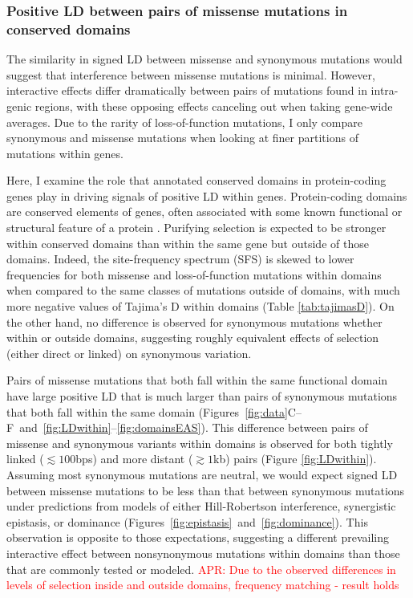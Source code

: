 \documentclass[]{article}
\newcommand{\comment}[1]{{\textcolor{red}{APR: #1}}}
\begin{document}
\subsubsection{Positive LD between pairs of missense mutations in conserved domains}

The similarity in signed LD between missense and synonymous mutations would
suggest that interference between missense mutations is minimal. However,
interactive effects differ dramatically between pairs of mutations found in
intra-genic regions, with these opposing effects canceling out when taking
gene-wide averages. Due to the rarity of loss-of-function mutations, I only
compare synonymous and missense mutations when looking at finer partitions of
mutations within genes.

Here, I examine the role that annotated conserved domains in protein-coding
genes play in driving signals of positive LD within genes. Protein-coding
domains are conserved elements of genes, often associated with some known
functional or structural feature of a protein \citep{Stanek2020-pa}. Purifying
selection is expected to be stronger within conserved domains than within the
same gene but outside of those domains. Indeed, the site-frequency spectrum
(SFS) is skewed to lower frequencies for both missense and loss-of-function
mutations within domains when compared to the same classes of mutations outside
of domains, with much more negative values of Tajima's D within domains (Table
\ref{tab:tajimasD}). On the other hand, no difference is observed for
synonymous mutations whether within or outside domains, suggesting roughly
equivalent effects of selection (either direct or linked) on synonymous
variation.

Pairs of missense mutations that both fall within the same functional domain
have large positive LD that is much larger than pairs of synonymous mutations
that both fall within the same domain
(Figures~\ref{fig:data}C--F~and~\ref{fig:LDwithin}--\ref{fig:domainsEAS}). This
difference between pairs of missense and synonymous variants within domains is
observed for both tightly linked (\(\lesssim 100\)bps) and more distant
(\(\gtrsim 1\)kb) pairs (Figure \ref{fig:LDwithin}). Assuming most
synonymous mutations are neutral, we would expect signed LD between missense
mutations to be less than that between synonymous mutations under predictions
from models of either Hill-Robertson interference, synergistic epistasis, or
dominance (Figures~\ref{fig:epistasis}~and~\ref{fig:dominance}). This
observation is opposite to those expectations, suggesting a different
prevailing interactive effect between nonsynonymous mutations within domains
than those that are commonly tested or modeled.
\comment{Due to the observed differences in levels of selection inside and outside domains, frequency matching - result holds}
\end{document}
